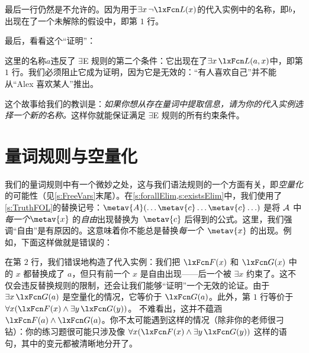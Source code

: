 最后一行仍然是不允许的。因为用于$\exists x\, \enot \atom{L}{x}$的代入实例中的名称，即$b$，出现在了一个未解除的假设中，即第 $1$ 行。

最后，看看这个“证明”：

\begin{fitchproof}
	\PR
	\open
		\AS
	\close
\ifHTMLtarget
\else
\fi
\end{fitchproof}


这里的名称$a$违反了 $\exists$E 规则的第二个条件：它出现在了$\exists x\, \atom{L}{a, x}$中，即第 $1$ 行。我们必须阻止它成为证明，因为它是无效的：“有人喜欢自己”并不能从“Alex 喜欢某人”推出。

这个故事给我们的教训是：\emph{如果你想从存在量词中提取信息，请为你的代入实例选择一个新的名称。}这样你就能保证满足 $\exists$E 规则的所有约束条件。

\section{量词规则与空量化}

我们的量词规则中有一个微妙之处，这与我们语法规则的一个方面有关，即\emph{空量化}的可能性（见\cref{s:FreeVars}末尾）。在\cref{s:forallElim,s:existsElim}中，我们使用了\cref{s:TruthFOL}的替换记号：$\metav{A}(\ldots
\metav{c} \ldots \metav{c} \ldots)$ 是将 $\mathcal{A}$ 中\emph{每一个}$\metav{x}$ 的\emph{自由}出现替换为~$\metav{c}$ 后得到的公式。这里，我们强调“自由”是有原因的。这意味着你不能总是替换\emph{每一个}~$\metav{x}$ 的出现。例如，下面这样做就是错误的：

\begin{fitchproof}
	\PR
	\ifHTMLtarget
\else
\fi
\end{fitchproof}


在第 $2$ 行，我们错误地构造了代入实例：我们把 $\atom{F}{x}$ 和 $\atom{G}{x}$ 中的 $x$ 都替换成了 $a$，但只有前一个 $x$ 是自由出现——后一个被 $\exists x$ 约束了。这不仅会违反替换规则的限制，还会让我们能够“证明”一个无效的论证。由于 $\exists x\,\atom{G}{a}$ 是空量化的情况，它等价于 $\atom{G}{a}$。此外，第 $1$ 行等价于 $\forall x(\atom{F}{x} \land \exists y\,\atom{G}{y})$。
不难看出，这并不蕴涵 $\atom{F}{a} \land
\atom{G}{a}$。你不太可能遇到这样的情况（除非你的老师很刁钻）：你的练习题很可能只涉及像 $\forall x(\atom{F}{x} \land \exists
y\,\atom{G}{y})$ 这样的语句，其中的变元都被清晰地分开了。

